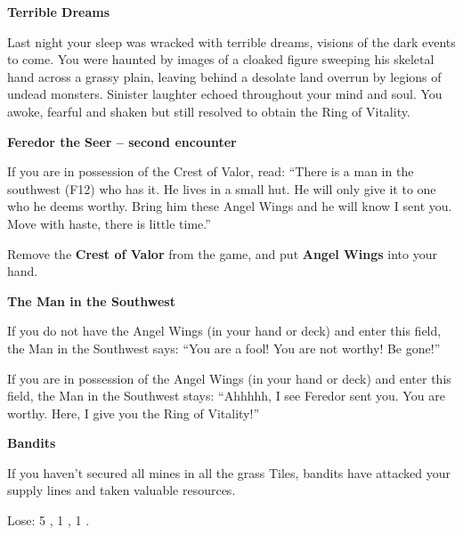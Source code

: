 \begin{multicols*}{2}
\textbf{Terrible Dreams}

Last night your sleep was wracked with terrible dreams, visions of the dark events to come.
You were haunted by images of a cloaked figure sweeping his skeletal hand across a grassy plain, leaving behind a desolate land overrun by legions of undead monsters.
Sinister laughter echoed throughout your mind and soul.
You awoke, fearful and shaken but still resolved to obtain the Ring of Vitality.

\textbf{Feredor the Seer -- second encounter}

If you are in possession of the Crest of Valor, read: ``There is a man in the southwest (F12) who has it.
He lives in a small hut.
He will only give it to one who he deems worthy.
Bring him these Angel Wings and he will know I sent you.
Move with haste, there is little time.''

\textcolor{darkcandyapplered}{Remove the \textbf{Crest of Valor} from the game, and put \textbf{Angel Wings} into your hand.}

\textbf{The Man in the Southwest}

If you do not have the Angel Wings (in your hand or deck) and enter this field, the Man in the Southwest says: ``You are a fool! You are not worthy! Be gone!''

If you are in possession of the Angel Wings (in your hand or deck) and enter this field, the Man in the Southwest stays: ``Ahhhhh, I see Feredor sent you.
You are worthy.
Here, I give you the Ring of Vitality!''


\textbf{Bandits}

If you haven't secured all mines in all the grass Tiles, bandits have attacked your supply lines and taken valuable resources.

\textcolor{darkcandyapplered}{Lose:} 5 , 1 , 1 .

\end{multicols*}
